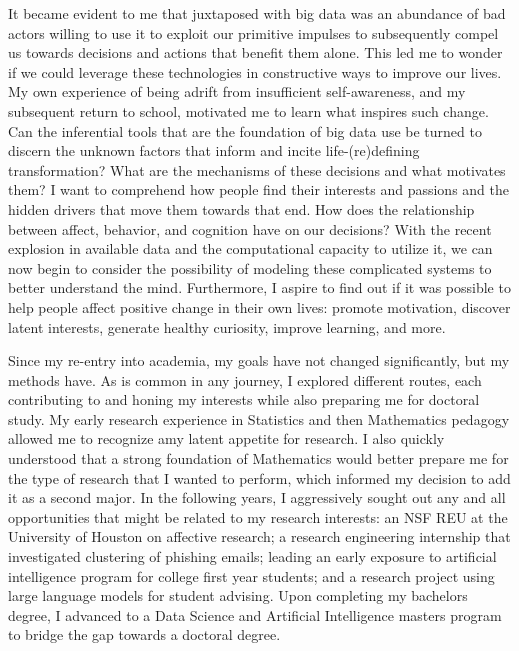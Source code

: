 \documentclass[12pt]{article}
\begin{document}
It became evident to me that juxtaposed with big data was an abundance of bad actors willing to use it to exploit our primitive
impulses to subsequently compel us towards decisions and actions that benefit them alone. This led me to wonder if we could leverage these
technologies in constructive ways to improve our lives. My own experience of being adrift from insufficient self-awareness, and my subsequent
return to school, motivated me to learn what inspires such change. Can the inferential tools that are the foundation of big data use be
turned to discern the unknown factors that inform and incite life-(re)defining transformation?  What are the mechanisms of these decisions
and what motivates them?  I want to comprehend how people find their interests and passions and the hidden drivers that move them towards
that end. How does the relationship between affect, behavior, and cognition have on our decisions?  With the recent explosion in available
data and the computational capacity to utilize it, we can now begin to consider the possibility of modeling these complicated systems to
better understand the mind.  Furthermore, I aspire to find out if it was possible to help people affect positive change in their own lives:
promote motivation, discover latent interests, generate healthy curiosity, improve learning, and more.

Since my re-entry into academia, my goals have not changed significantly, but my methods have. As is common in any journey, I explored
different routes, each contributing to and honing my interests while also preparing me for doctoral study.  My early research experience in
Statistics and then Mathematics pedagogy allowed me to recognize amy latent appetite for research.  I also quickly understood that a strong
foundation of Mathematics would better prepare me for the type of research that I wanted to perform, which informed my decision to add it as
a second major.  In the following years, I aggressively sought out any and all opportunities that might be related to my research
interests: an NSF REU at the University of Houston on affective research; a research engineering internship that investigated clustering of
phishing emails; leading an early exposure to artificial intelligence program for college first year students; and a research project using
large language models for student advising.  Upon completing my bachelors degree, I advanced to a Data Science and Artificial Intelligence
masters program to bridge the gap towards a doctoral degree.
\end{document}

